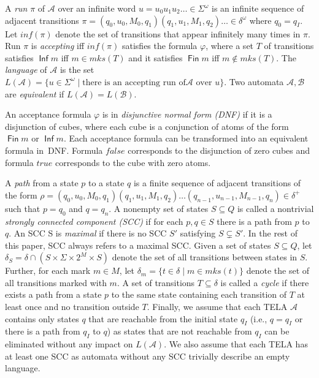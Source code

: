\documentclass[a4paper,UKenglish,cleveref,autoref,thm-restate]{lipics-v2021}
\newcommand{\todo}[1]{\marginpar{\textcolor{red}{#1}}}
\DeclareMathOperator{\Inf}{\mathsf{Inf}}
\DeclareMathOperator{\Fin}{\mathsf{Fin}}
\newcommand{\minf}{\mathit{inf}}
\newcommand{\mks}{\mathit{mks}}
\def\false{\mathit{false}}
\def\true{\mathit{true}}
\newcommand{\mA}{\mathcal{A}}
\newcommand{\mB}{\mathcal{B}}
\begin{document}
A \emph{run} $\pi$ of $\mA$ over an infinite word
$u = u_{0}u_{1}u_{2}\ldots \in \Sigma^{\omega}$ is an infinite sequence
of adjacent transitions
$\pi=(q_0,u_0,M_0,q_1)(q_1,u_1,M_1,q_2)\ldots\in\delta^{\omega}$ where
$q_0=q_I$. Let $\minf(\pi)$ denote the set of transitions that appear
infinitely many times in $\pi$. Run $\pi$ is \emph{accepting} iff
$\minf(\pi)$ satisfies the formula $\varphi$, where a set $T$ of
transitions satisfies $\Inf m$ iff $m\in\mks(T)$ and it satisfies
$\Fin m$ iff $m\not\in\mks(T)$. The \emph{language} of $\mA$ is
the set
$L(\mA)=\{u\in \Sigma^{\omega}\mid\textrm{there is an accepting run of
}\mA\textrm{ over }u\}$. Two automata $\mA,\mB$ are \emph{equivalent}
if $L(\mA)=L(\mB)$.

An acceptance formula $\varphi$ is in \emph{disjunctive normal form
  (DNF)} if it is a disjunction of cubes, where each cube is a
conjunction of atoms of the form $\Fin m$ or $\Inf m$.  Each
acceptance formula can be transformed into an equivalent formula
in~DNF. Formula $\false$ corresponds to the disjunction of zero
cubes and formula $\true$ corresponds to the cube with zero atoms.

A \emph{path} from a state $p$ to a state $q$ is a finite sequence of
adjacent transitions of the form
$\rho=(q_0,u_0,M_0,q_1)(q_1,u_1,M_1,q_2)\ldots(q_{n-1},u_{n-1},M_{n-1},q_n)\in\delta^+$
such that $p=q_0$ and $q=q_n$. A nonempty set of states $S\subseteq Q$
is called a nontrivial \emph{strongly connected component (SCC)} if
for each $p,q\in S$ there is a path from $p$ to $q$. An SCC S is
\emph{maximal} if there is no SCC $S'$ satisfying $S\subsetneq S'$. In
the rest of this paper, SCC always refers to a maximal SCC. Given a
set of states $S\subseteq Q$, let $\delta_S=\delta\cap (S\times \Sigma \times 2^M \times S)$
denote the set of all transitions between states in $S$. Further, for
each mark $m\in M$, let $\delta_m=\{t\in\delta\mid m\in
\mks(t)\}$ denote the set of all transitions
marked with $m$.
A set of transitions $T\subseteq\delta$ is called a \emph{cycle} if
there exists a path from a state $p$ to the same state containing each
transition of $T$ at least once and no transition outside
$T$. Finally, we assume that each TELA $\mA$ contains only states $q$
that are reachable from the initial state $q_I$ (i.e., $q=q_I$ or
there is a path from $q_I$ to $q$) as states that are not reachable
from $q_I$ can be eliminated without any impact on $L(\mA)$. We also
assume that each TELA has at least one SCC as automata without any SCC
trivially describe an empty language.
\end{document}
